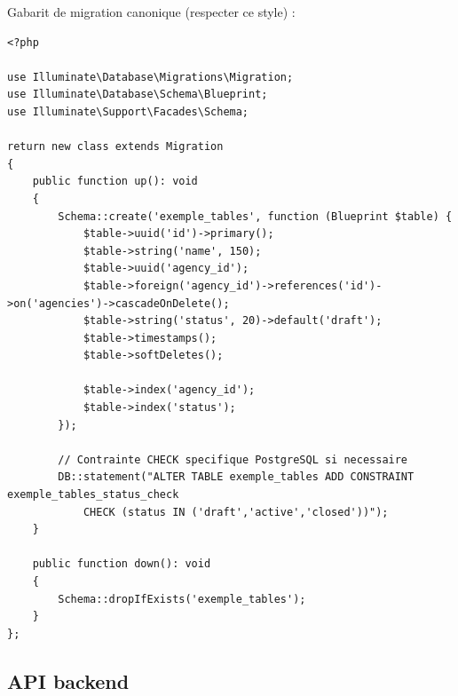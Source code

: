 \documentclass[11pt,a4paper]{article}
\begin{document}
Gabarit de migration canonique (respecter ce style) :

\begin{lstlisting}
<?php

use Illuminate\Database\Migrations\Migration;
use Illuminate\Database\Schema\Blueprint;
use Illuminate\Support\Facades\Schema;

return new class extends Migration
{
    public function up(): void
    {
        Schema::create('exemple_tables', function (Blueprint $table) {
            $table->uuid('id')->primary();
            $table->string('name', 150);
            $table->uuid('agency_id');
            $table->foreign('agency_id')->references('id')->on('agencies')->cascadeOnDelete();
            $table->string('status', 20)->default('draft');
            $table->timestamps();
            $table->softDeletes();

            $table->index('agency_id');
            $table->index('status');
        });

        // Contrainte CHECK specifique PostgreSQL si necessaire
        DB::statement("ALTER TABLE exemple_tables ADD CONSTRAINT exemple_tables_status_check
            CHECK (status IN ('draft','active','closed'))");
    }

    public function down(): void
    {
        Schema::dropIfExists('exemple_tables');
    }
};
\end{lstlisting}

\subsection{API backend}
\end{document}
